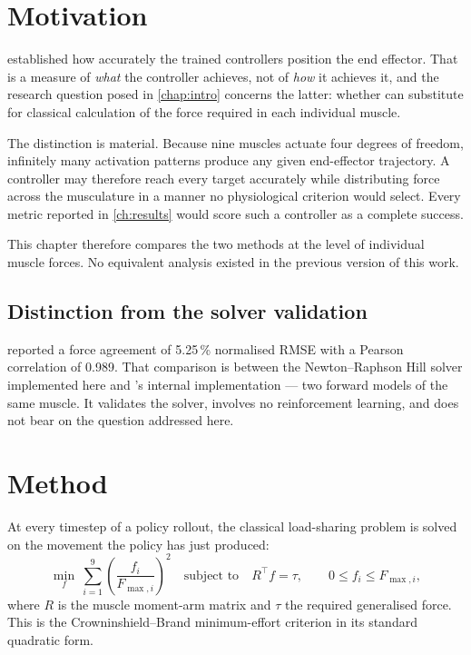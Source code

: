 \section{Motivation}

 established how accurately the trained controllers position the
end effector. That is a measure of \emph{what} the controller achieves, not of
\emph{how} it achieves it, and the research question posed in \cref{chap:intro}
concerns the latter: whether \DRL can substitute for classical calculation of the
force required in each individual muscle.

The distinction is material. Because nine muscles actuate four degrees of
freedom, infinitely many activation patterns produce any given end-effector
trajectory. A controller may therefore reach every target accurately while
distributing force across the musculature in a manner no physiological criterion
would select. Every metric reported in \cref{ch:results} would score such a
controller as a complete success.

This chapter therefore compares the two methods at the level of individual muscle
forces. No equivalent analysis existed in the previous version of this work.

\subsection{Distinction from the solver validation}

 reported a force agreement of 5.25\,\% normalised
RMSE with a Pearson correlation of 0.989. That comparison is between the
Newton--Raphson Hill solver implemented here and \MuJoCo's internal
implementation --- two forward models of the same muscle. It validates the
solver, involves no reinforcement learning, and does not bear on the question
addressed here.

\section{Method}

At every timestep of a policy rollout, the classical load-sharing problem is
solved on the movement the policy has just produced:
\begin{equation}
\min_{f}\ \sum_{i=1}^{9}\left(\frac{f_i}{F_{\max,i}}\right)^{2}
\quad\text{subject to}\quad
R^{\top} f = \tau,
\qquad 0 \le f_i \le F_{\max,i},
\label{eq:statopt2}
\end{equation}
where $R$ is the muscle moment-arm matrix and $\tau$ the required generalised
force. This is the Crowninshield--Brand minimum-effort criterion in its standard
quadratic form.

